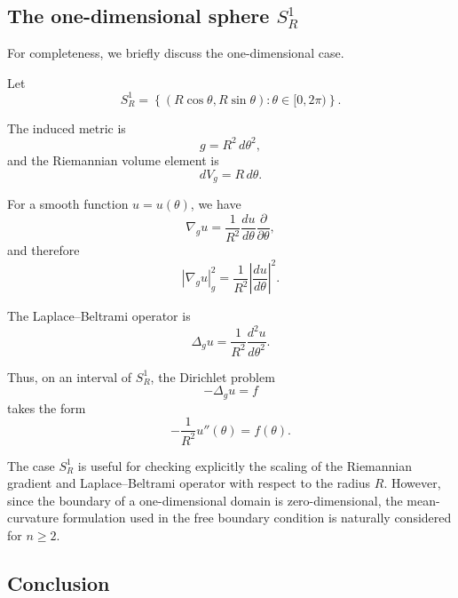 \documentclass{article}
\begin{document}
\subsection{The one-dimensional sphere $S_R^1$}
\label{subsec:S1-example}

For completeness, we briefly discuss the one-dimensional case.

Let
\[
S_R^1
=
\left\{
(R\cos\theta,R\sin\theta):
\theta\in[0,2\pi)
\right\}.
\]

The induced metric is
\begin{equation}
g=R^2\,d\theta^2,
\label{eq:S1-metric}
\end{equation}
and the Riemannian volume element is
\begin{equation}
dV_g=R\,d\theta.
\label{eq:S1-volume}
\end{equation}

For a smooth function $u=u(\theta)$, we have
\begin{equation}
\nabla_g u
=
\frac{1}{R^2}
\frac{du}{d\theta}
\frac{\partial}{\partial\theta},
\label{eq:S1-gradient}
\end{equation}
and therefore
\begin{equation}
|\nabla_g u|_g^2
=
\frac{1}{R^2}
\left|\frac{du}{d\theta}\right|^2.
\label{eq:S1-gradient-norm}
\end{equation}

The Laplace--Beltrami operator is
\begin{equation}
\Delta_g u
=
\frac{1}{R^2}
\frac{d^2u}{d\theta^2}.
\label{eq:S1-laplacian}
\end{equation}

Thus, on an interval of $S_R^1$, the Dirichlet problem
\[
-\Delta_g u=f
\]
takes the form
\begin{equation}
-\frac{1}{R^2}u''(\theta)
=
f(\theta).
\label{eq:S1-dirichlet}
\end{equation}

The case $S_R^1$ is useful for checking explicitly the scaling of the
Riemannian gradient and Laplace--Beltrami operator with respect to the
radius $R$. However, since the boundary of a one-dimensional domain is
zero-dimensional, the mean-curvature formulation used in the free
boundary condition is naturally considered for $n\geq2$.

\subsection{Conclusion}
\label{subsec:examples-conclusion}
\end{document}
